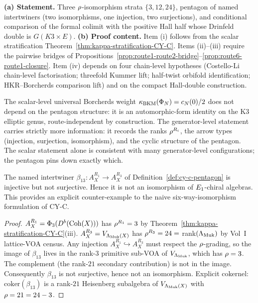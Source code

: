 \begin{remark}
\label{rem:generator-level-first-principles-triple}
\textbf{(a) Statement.} Three \(\rho\)-isomorphism strata \(\{3,12,24\}\), pentagon of named intertwiners
(two isomorphisms, one injection, two surjections), and conditional comparison of the formal colimit with
the positive Hall half whose Drinfeld double is \(G(K3 \times E)\).
\textbf{(b) Proof content.} Item (i) follows from the scalar stratification
Theorem~\ref{thm:kappa-stratification-CY-C}. Items (ii)--(iii) require the pairwise bridges of
Propositions~\ref{prop:route1-route2-bridge}--\ref{prop:route6-route1-closure}. Item (iv) depends on four
chain-level hypotheses (Costello-Li chain-level factorisation; threefold Kummer lift; half-twist orbifold
identification; HKR--Borcherds comparison lift) and on the compact Hall-double construction.
\end{remark}

\begin{remark}
\label{rem:scalar-vs-generator-levels}
The scalar-level universal Borcherds weight $\kappa_{\mathrm{BKM}}(\Phi_N) = c_N(0)/2$ does not depend on the pentagon structure:
it is an automorphic-form identity on the K3 elliptic genus, route-independent by construction. The
generator-level statement carries strictly more information: it records the ranks $\rho^{R_i}$, the
arrow types (injection, surjection, isomorphism), and the cyclic structure of the pentagon. The scalar
statement alone is consistent with many generator-level configurations; the pentagon pins down exactly
which.
\end{remark}

\begin{proposition}
\label{prop:beta-13-not-isomorphism-counter-example}
The named intertwiner $\beta_{13}: A_X^{R_1} \to A_X^{R_3}$ of Definition~\ref{def:cy-c-pentagon} is
injective but not surjective. Hence it is not an isomorphism of $E_{1}$-chiral algebras. This provides
an explicit counter-example to the naive six-way-isomorphism formulation of CY-C.
\end{proposition}

\begin{proof}
$A_X^{R_1} = \Phi_3(D^b(\mathrm{Coh}(X)))$ has $\rho^{R_1} = 3$ by Theorem~\ref{thm:kappa-stratification-CY-C}(iii).
$A_X^{R_3} = V_{\Lambda_{\mathrm{Muk}}(X)}$ has $\rho^{R_3} = 24 = $ rank$(\Lambda_{\mathrm{Muk}})$ by Vol~I lattice-VOA census. Any injection
$A_X^{R_1} \hookrightarrow A_X^{R_3}$ must respect the $\rho$-grading, so the image of $\beta_{13}$ lives in
the rank-$3$ primitive sub-VOA of $V_{\Lambda_{\mathrm{Muk}}}$, which has $\rho = 3$. The complement (the rank-$21$
secondary contribution) is not in the image. Consequently $\beta_{13}$ is not surjective, hence not an
isomorphism. Explicit cokernel: $\mathrm{coker}(\beta_{13})$ is a rank-$21$ Heisenberg subalgebra of
$V_{\Lambda_{\mathrm{Muk}}(X)}$ with $\rho = 21 = 24 - 3$.
\end{proof}

